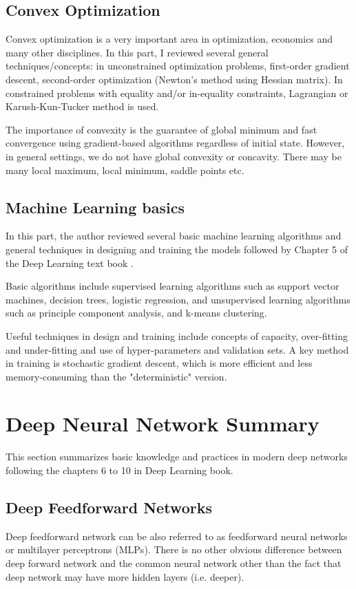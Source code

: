 \documentclass[11pt]{article}
\theoremstyle{plain}
\begin{document}
\subsection{Convex Optimization}
Convex optimization is a very important area in optimization, economics and 
many other disciplines. In this part, I reviewed several general 
techniques/concepts: in unconstrained optimization problems, first-order 
gradient descent, second-order optimization (Newton's method using 
Hessian matrix). In constrained problems with equality and/or in-equality 
constraints, Lagrangian or Karush-Kun-Tucker method is used. 

The importance of convexity is the guarantee of global minimum and fast 
convergence using gradient-based algorithms regardless of initial state. 
However, in general settings, we do not have global convexity or concavity. 
There may be many local maximum, local minimum, saddle points etc. 

\subsection{Machine Learning basics}

In this part, the author reviewed several basic machine learning algorithms 
and general techniques in designing and training the models followed by 
Chapter 5 of the Deep Learning text book \cite{Goodfellow-et-al-2016}. 

Basic algorithms include supervised learning algorithms such as support 
vector machines, decision trees, logistic regression, and unsupervised 
learning algorithms such as principle component analysis, and k-means 
clustering. 

Useful techniques in design and training include concepts of capacity, 
over-fitting and under-fitting and use of hyper-parameters and validation 
sets. A key method in training is stochastic gradient descent, which is more 
efficient and less memory-consuming than the "deterministic" version. 

\section{Deep Neural Network Summary}
\label{s:dnns}

This section summarizes basic knowledge and practices in modern deep 
networks following the chapters 6 to 10 in Deep Learning book. 

\subsection{Deep Feedforward Networks}
Deep feedforward network can be also referred to as feedforward neural 
networks or multilayer perceptrons (MLPs). There is no other obvious 
difference between deep forward network and the common neural network 
other than the fact that deep network may have more hidden layers (i.e. 
deeper). 
\end{document}
